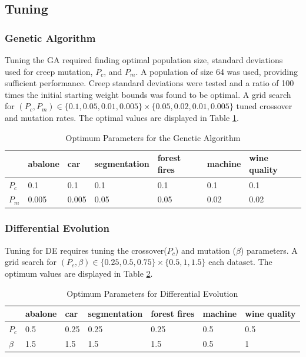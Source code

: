 \documentclass[twoside,11pt]{article}
\begin{document}
\subsection{Tuning}

\subsubsection{Genetic Algorithm}

	Tuning the GA required finding optimal population size, standard deviations used for creep mutation, $P_c$, and $P_m$. A population of size 64 was used, providing sufficient performance. Creep standard deviations were tested and a ratio of 100 times the initial starting weight bounds was found to be optimal. A grid search for $(P_c, P_m) \in \{0.1, 0.05, 0.01, 0.005\} \times \{0.05, 0.02, 0.01, 0.005\}$ tuned crossover and mutation rates. The optimal values are displayed in Table \ref{ga-tuning-table}.

	\begin{table}[h]
		\centering
		\begin{tabular}{|l|l|l|l|l|l|l|}
			\hline
			       & abalone & car & segmentation & forest fires & machine & wine quality  \\ \hline
			$P_c$  &     0.1 & 0.1 &          0.1 &          0.1 &     0.1 &          0.1  \\ \hline
			$P_m$  &   0.005 & 0.005 &       0.05 &         0.05 &    0.02 &         0.02  \\ \hline
		\end{tabular}
		\caption{Optimum Parameters for the Genetic Algorithm}
		\label{ga-tuning-table}
	\end{table}

\subsubsection{Differential Evolution}

	Tuning for DE requires tuning the crossover($P_c$) and mutation ($\beta$) parameters. A grid search for
	$(P_c, \beta) \in \{ 0.25, 0.5, 0.75 \} \times \{ 0.5, 1, 1.5 \}$
	each dataset.
	The optimum values are displayed in Table \ref{de-tuning-table}.
	\begin{table}[h]
		\centering
		\begin{tabular}{|l|l|l|l|l|l|l|}
			\hline
			       & abalone & car & segmentation & forest fires & machine & wine quality  \\ \hline
			$P_c$  &     0.5 & 0.25&         0.25 &         0.25 &     0.5 &          0.5  \\ \hline
			$\beta$&     1.5 & 1.5 &          1.5 &          1.5 &     0.5 &            1  \\ \hline
		\end{tabular}
		\caption{Optimum Parameters for Differential Evolution}
		\label{de-tuning-table}
	\end{table}
\end{document}
